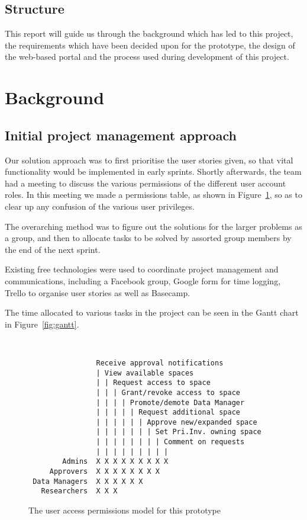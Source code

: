 \documentclass[a4paper,titlepage,12pt]{article}
\let\stdsection\section
\renewcommand\section{\newpage\stdsection}
\begin{document}
\subsection{Structure}

This report will guide us through the background which has led to this project,
the requirements which have been decided upon for the prototype, the design of
the web-based portal and the process used during development of this project.

\section{Background}

\subsection{Initial project management approach}

Our solution approach was to first prioritise the user stories given, so that
vital functionality would be implemented in early sprints. Shortly afterwards,
the team had a meeting to discuss the various permissions of the different user
account roles. In this meeting we made a permissions table, as shown in
Figure~\ref{fig:permissions}, so as to clear up any confusion of the various
user privileges.

The overarching method was to figure out the solutions for the larger problems
as a group, and then to allocate tasks to be solved by assorted group members
by the end of the next sprint.

Existing free technologies were used to coordinate project management and
communications, including a Facebook group, Google form for time logging,
Trello to organise user stories as well as Basecamp.

The time allocated to various tasks in the project can be seen in the Gantt
chart in Figure~\ref{fig:gantt}.

\begin{figure}[h]
	\caption{The user access permissions model for this prototype}
	\label{fig:permissions}
	\quad\\
\begin{lstlisting}
                Receive approval notifications
                | View available spaces
                | | Request access to space
                | | | Grant/revoke access to space
                | | | | Promote/demote Data Manager
                | | | | | Request additional space
                | | | | | | Approve new/expanded space
                | | | | | | | Set Pri.Inv. owning space
                | | | | | | | | Comment on requests
                | | | | | | | | |
        Admins  X X X X X X X X X
     Approvers  X X X X X X X X
 Data Managers  X X X X X X
   Researchers  X X X
\end{lstlisting}
\end{figure}
\end{document}
